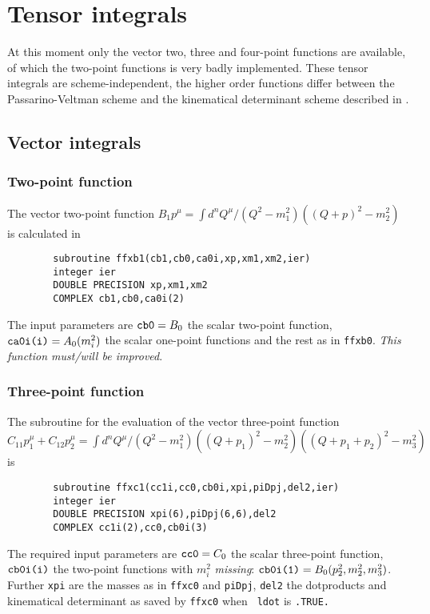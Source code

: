 
\section{Tensor integrals}

At this moment only the vector two, three and four-point functions are 
available, of which the two-point functions is very badly implemented.  These 
tensor integrals are scheme-independent, the higher order functions differ 
between the Passarino-Veltman scheme \cite{Passarino&Veltman} and the 
kinematical determinant scheme described in \cite{NewAlgorithms}.

\subsection{Vector integrals}

\subsubsection{Two-point function}

The vector two-point function $B_1 p^\mu = \int d^n 
Q^\mu/(Q^2-m_1^2)((Q+p)^2-m_2^2)$ is calculated in
\begin{verbatim}
        subroutine ffxb1(cb1,cb0,ca0i,xp,xm1,xm2,ier)
        integer ier
        DOUBLE PRECISION xp,xm1,xm2
        COMPLEX cb1,cb0,ca0i(2)
\end{verbatim}
The input parameters are $\mbox{\tt cb0} = B_0$ the scalar two-point function, 
$\mbox{\tt ca0i(i)} = A_0(m_i^2)$ the scalar one-point functions and the rest 
as in {\tt ffxb0}.  {\em This function must/will be improved}.

\subsubsection{Three-point function}

The subroutine for the evaluation of the vector three-point function $C_{11} 
p_1^\mu + C_{12} p_2^\mu = \int d^n Q^\mu / (Q^2-m_1^2) ((Q+p_1)^2-m_2^2) 
((Q+p_1+p_2)^2-m_3^2)$ is
\begin{verbatim}
        subroutine ffxc1(cc1i,cc0,cb0i,xpi,piDpj,del2,ier)
        integer ier                            
        DOUBLE PRECISION xpi(6),piDpj(6,6),del2
        COMPLEX cc1i(2),cc0,cb0i(3)            
\end{verbatim}
The required input parameters are $\mbox{\tt cc0} = C_0$ the scalar 
three-point function, $\mbox{\tt cb0i(i)}$ the two-point functions with 
$m_i^2$ {\em missing}: $\mbox{\tt cb0i(1)} = B_0(p_2^2,m_2^2,m_3^2)$.  Further 
{\tt xpi} are the masses as in {\tt ffxc0} and {\tt piDpj}, {\tt del2} the 
dotproducts and kinematical determinant as saved by {\tt ffxc0} when {\tt 
ldot} is {\tt .TRUE.}

